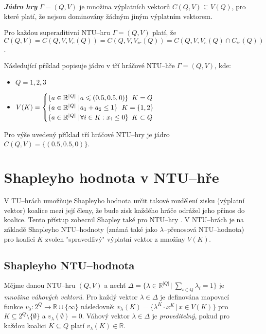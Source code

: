         \textit{\textbf{Jádro hry}} $\Gamma = (Q, V)$ je množina výplatních vektorů $C(Q, V) \subseteq V(Q)$, pro které platí, že nejsou dominovány žádným jiným výplatním vektorem.

        Pro každou superaditivní NTU--hru $\Gamma = (Q, V)$ platí, že $C(Q, V) = C(Q, V, V_e(Q)) = C(Q, V, V_{ir}(Q)) = C(Q, V, V_e(Q) \cap C_{ir}(Q))$.

        Následující příklad popisuje jádro v tří hráčové NTU--hře $\Gamma = (Q, V)$, kde:

        \begin{itemize}
            \vspace*{-0.3em}
            \item $Q = 1, 2, 3$
            \item $V(K) = \begin{cases}
                \{a \in \mathbb{R}^{|Q|}\,|\, a \leqslant (0.5, 0.5, 0)\} & \hspace*{-0.5em}K = Q\\
                \{a \in \mathbb{R}^{|Q|}\,|\, a_1 + a_2 \leq 1\} & \hspace*{-2em}K = \{1, 2\}\\
                \{a \in \mathbb{R}^{|Q|}\,|\, \forall i \in K: x_i \leq 0\} & \hspace*{-0.5em}K \subset Q
            \end{cases}$
        \end{itemize}

        Pro výše uvedený příklad tří hráčové NTU--hry je jádro $C(Q, V) = \{(0.5, 0.5, 0)\}$.

\section{Shapleyho hodnota v NTU--hře}
    \label{sec:Shapley}
    V TU--hrách umožňuje Shapleyho hodnota \cite{Shapley1953} určit takové rozdělení zisku (výplatní vektor) koalice mezi její členy, že bude zisk každého hráče odrážel jeho přínos do koalice. Tento přístup zobecnil Shapley také pro NTU--hry \cite{Shapley1969}. V NTU--hrách je na základě Shapleyho NTU--hodnoty (známá také jako $\lambda$--přenosová NTU--hodnota) pro koalici $K$ zvolen "spravedlivý" výplatní vektor z množiny $V(K)$.

    \subsection{Shapleyho NTU--hodnota}
        Mějme danou NTU--hru $(Q, V)$ a nechť $\Delta = \{\lambda \in \mathbb{R}^{|Q|}\,|\, \sum_{i\in Q}\lambda_i = 1\}$ je \textit{množina váhových vektorů}. Pro každý vektor $\lambda \in \Delta$ je definována mapovací funkce $v_\lambda: 2^Q \rightarrow \mathbb{R} \cup \{\infty\}$ následovně: $v_\lambda(K) = \{\lambda^K \cdot x^K\,|\, x \in V(K)\}$ pro $K \subseteq 2^Q \setminus \{\emptyset\}$ a $v_\lambda(\emptyset) = 0$. Váhový vektor $\lambda \in \Delta$ je \textit{proveditelný}, pokud pro každou koalici $K \subseteq Q$ platí $v_\lambda(K) \in \mathbb{R}$.

